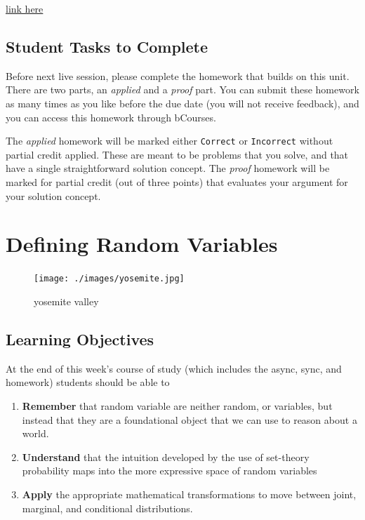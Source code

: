 \documentclass[
]{book}
\providecommand{\tightlist}{%
  \setlength{\itemsep}{0pt}\setlength{\parskip}{0pt}}
\theoremstyle{definition}
\theoremstyle{definition}
\theoremstyle{definition}
\theoremstyle{definition}
\theoremstyle{remark}
\begin{document}
\href{https://w203.herokuapp.com/problems/106}{link here}

\hypertarget{student-tasks-to-complete}{%
\section{Student Tasks to Complete}\label{student-tasks-to-complete}}

Before next live session, please complete the homework that builds on this unit. There are two parts, an \emph{applied} and a \emph{proof} part. You can submit these homework as many times as you like before the due date (you will not receive feedback), and you can access this homework through bCourses.

The \emph{applied} homework will be marked either \texttt{Correct} or \texttt{Incorrect} without partial credit applied. These are meant to be problems that you solve, and that have a single straightforward solution concept. The \emph{proof} homework will be marked for partial credit (out of three points) that evaluates your argument for your solution concept.

\hypertarget{defining-random-variables}{%
\chapter{Defining Random Variables}\label{defining-random-variables}}

\begin{figure}
\centering
\texttt{[image: ./images/yosemite.jpg]}
\caption{yosemite valley}
\end{figure}

\hypertarget{learning-objectives-1}{%
\section{Learning Objectives}\label{learning-objectives-1}}

At the end of this week's course of study (which includes the async, sync, and homework) students should be able to

\begin{enumerate}
\def\labelenumi{\arabic{enumi}.}
\tightlist
\item
  \textbf{Remember} that random variable are neither random, or variables, but instead that they are a foundational object that we can use to reason about a world.
\item
  \textbf{Understand} that the intuition developed by the use of set-theory probability maps into the more expressive space of random variables
\item
  \textbf{Apply} the appropriate mathematical transformations to move between joint, marginal, and conditional distributions.
\end{enumerate}
\end{document}
